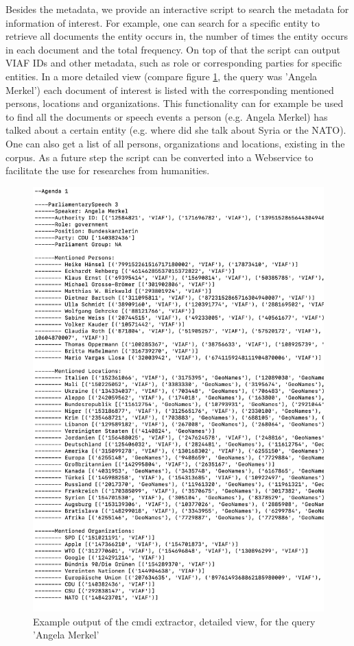 \documentclass{article}
\begin{document}
Besides the metadata, we provide an interactive script to search the metadata for information of interest. For example, one can search for a specific entity to retrieve all documents the entity occurs in, the number of times the entity occurs in each document and the total frequency. On top of that the script can output VIAF IDs and other metadata, such as role or corresponding parties for specific entities. In a more detailed view (compare figure \ref{fig:cmdiextractor}, the query was 'Angela Merkel') each document of interest is listed with the corresponding mentioned persons, locations and organizations. This functionality can for example be used to find all the documents or speech events a person (e.g. Angela Merkel) has talked about a certain entity (e.g. where did she talk about Syria or the NATO). One can also get a list of all persons, organizations and locations, existing in the corpus. As a future step the script can be converted into a Webservice to facilitate the use for researches from humanities. 
\begin{figure}
    \centering
    \includegraphics[width=\textwidth]{cmdiextractor.png}
    \caption{Example output of the cmdi extractor, detailed view, for the query 'Angela Merkel'}
    \label{fig:cmdiextractor}
\end{figure}
\end{document}
